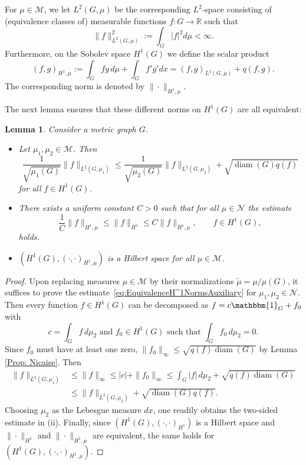 \documentclass[reqno]{amsart}
\theoremstyle{plain}
\newtheorem{lem}[thm]{Lemma}
\theoremstyle{definition}
\theoremstyle{remark}
\numberwithin{equation}{section}
\newcommand{\R}{\mathbb{R}}     %
\newcommand{\cM}{\mathcal{M}}
\newcommand{\cN}{\mathcal{N}}
\newcommand{\one}{\mathbbm{1}}
\newcommand{\diam}{\operatorname{diam}}
\begin{document}
				
		For $\mu \in \cM$, we let $L^2(G, \mu)$ be the corresponding $L^2$-space consisting of (equivalence classes of) measurable functions $f \colon G \to \R$ such that
		\[
		\|f\|^2_{L^2(G,\mu)} := \int_{G}|f|^2d\mu < \infty.
		\]
		Furthermore, on the Sobolev space $H^1(G)$ we define the scalar product
		\[
		(f,g)_{H^1, \mu} := \int_G fg \, d\mu + \int_{G} f'g' d x =(f,g)_{L^2(G, \mu)} + q(f,g).
		\]
		The corresponding norm is denoted by $\|\cdot \|_{H^1, \mu}$.
		
		

		
		
		The next lemma ensures that these different norms on $H^1(G)$ are all equivalent:
		
		
		\begin{lem} \label{lem:EquivalenceH^1Norms} Consider a metric graph $G$.
		\begin{itemize}
		\item [(i)] Let $\mu_1, \mu_2 \in \cM$. Then
			\begin{equation} \label{eq:EquivalenceH^1NormsAuxiliary}
			\frac{1}{\sqrt{\mu_1(G)}} \|f\|_{L^2(G, \mu_1)} \le \frac{1}{\sqrt{\mu_2(G)}}  \|f\|_{L^2(G,\mu_2)} + \sqrt{\diam (G) q(f)}
			\end{equation}
		for all $f \in H^1(G)$.
			
			\item [(ii)] There exists a uniform constant $C >0$ such that for all $\mu \in \cN$ the estimate
			\[
			\frac{1}{C} \|f \|_{H^1, \mu} \le \|f\|_{H^1} \le C \|f\|_{H^1, \mu}, \qquad f \in H^1(G),
			\]
			holds.
			\item [(iii)] $(H^1(G), (\cdot, \cdot)_{H^1, \mu})$ is a Hilbert space for all $\mu \in \cM$.
			\end{itemize}
			\end{lem}
		\begin{proof} Upon replacing measures $\mu\in\cM$ by their normalizations $\widetilde \mu = \mu/\mu(G)$, it suffices to prove the estimate~\eqref{eq:EquivalenceH^1NormsAuxiliary} for $\mu_1, \mu_2 \in \cN$. Then every function $f\in H^1(G)$ can be decomposed as $f=c\one_G + f_0$ with 
			\[
			c= \int_G f \, d \mu_2 \text{ and } f_0 \in H^1(G) \text{ such that } \int_{G} f_0 \, d \mu_2 = 0. 
			\]
		Since $f_0$ must have at least one zero, $\|f_0\|_\infty \leq \sqrt{q(f) \diam(G)}$ by Lemma \ref{Prop: Nicaise}. Then 
			\begin{align*}\label{L2muH1ineq}
					\|f\|_{L^2(G,\mu_1)} &\leq \|f\|_{\infty}\leq |c|+ \|f_0\|_{\infty} \leq \int_{G} |f| \, d\mu_2 + \sqrt{q(f)\diam(G)} \\
					&\leq \|f\|_{L^2(G, \mu_2)} + \sqrt{\diam(G)q(f)}.
				\end{align*}
			Choosing $\mu_2$ as the Lebesgue measure $dx$, one readily obtains the two-sided estimate in (ii). Finally, since $(H^1(G), (\cdot, \cdot)_{H^1})$ is a Hilbert space and  $\|\cdot\|_{H^1}$ and $\|\cdot\|_{H^1, \mu}$ are equivalent, the same holds for $(H^1(G), (\cdot, \cdot)_{H^1, \mu})$.
			\end{proof}
\end{document}
